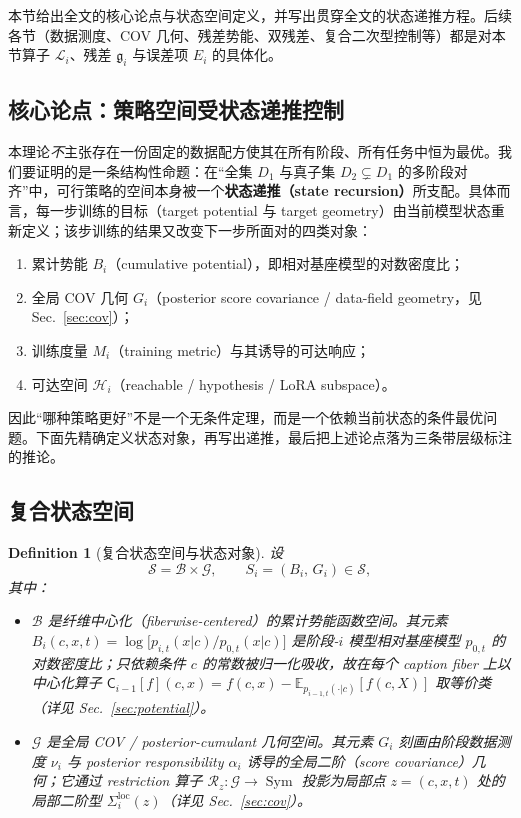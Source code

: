 \documentclass[11pt,a4paper]{article}
\newtheorem{definition}[theorem]{Definition}
\newcommand{\E}{\mathbb{E}}
\newcommand{\cH}{\mathcal{H}}   %
\newcommand{\cL}{\mathcal{L}}   %
\newcommand{\cS}{\mathcal{S}}   %
\newcommand{\cG}{\mathcal{G}}   %
\newcommand{\cB}{\mathcal{B}}   %
\newcommand{\Rstr}{\mathcal{R}}     %
\newcommand{\Center}{\mathsf{C}}    %
\newcommand{\gres}{\bm{\mathfrak{g}}} %
\newcommand{\Sym}{\operatorname{Sym}}
\begin{document}
本节给出全文的核心论点与状态空间定义，并写出贯穿全文的状态递推方程。后续各节（数据测度、COV 几何、残差势能、双残差、复合二次型控制等）都是对本节算子 $\cL_i$、残差 $\gres_i$ 与误差项 $E_i$ 的具体化。

\subsection{核心论点：策略空间受状态递推控制}

本理论\emph{不}主张存在一份固定的数据配方使其在所有阶段、所有任务中恒为最优。我们要证明的是一条结构性命题：在“全集 $D_1$ 与真子集 $D_2\subsetneq D_1$ 的多阶段对齐”中，可行策略的空间本身被一个\textbf{状态递推（state recursion）}所支配。具体而言，每一步训练的目标（target potential 与 target geometry）由当前模型状态重新定义；该步训练的结果又改变下一步所面对的四类对象：

\begin{enumerate}[label=(\roman*)]
  \item 累计势能 $B_i$（cumulative potential），即相对基座模型的对数密度比；
  \item 全局 COV 几何 $G_i$（posterior score covariance / data-field geometry，见 Sec.~\ref{sec:cov}）；
  \item 训练度量 $M_i$（training metric）与其诱导的可达响应；
  \item 可达空间 $\cH_i$（reachable / hypothesis / LoRA subspace）。
\end{enumerate}

因此“哪种策略更好”不是一个无条件定理，而是一个依赖当前状态的条件最优问题。下面先精确定义状态对象，再写出递推，最后把上述论点落为三条带层级标注的推论。

\subsection{复合状态空间}

\begin{definition}[复合状态空间与状态对象]\label{def:s1:state-space}
设
\begin{equation}\label{eq:s1:state-space}
  \cS=\cB\times\cG,\qquad S_i=(B_i,\,G_i)\in\cS,
\end{equation}
其中：
\begin{itemize}
  \item $\cB$ 是\emph{纤维中心化}（fiberwise-centered）的累计势能函数空间。其元素
  $B_i(c,x,t)=\log\!\bigl[p_{i,t}(x|c)/p_{0,t}(x|c)\bigr]$ 是阶段-$i$ 模型相对基座模型 $p_{0,t}$ 的对数密度比；只依赖条件 $c$ 的常数被归一化吸收，故在每个 caption fiber 上以中心化算子
  $\Center_{i-1}[f](c,x)=f(c,x)-\E_{p_{i-1,t}(\cdot|c)}[f(c,X)]$ 取等价类（详见 Sec.~\ref{sec:potential}）。
  \item $\cG$ 是\emph{全局} COV / posterior-cumulant 几何空间。其元素 $G_i$ 刻画由阶段数据测度 $\nu_i$ 与 posterior responsibility $\alpha_i$ 诱导的全局二阶（score covariance）几何；它通过 restriction 算子 $\Rstr_z:\cG\to\Sym$ 投影为局部点 $z=(c,x,t)$ 处的局部二阶型 $\Sigma_i^{\mathrm{loc}}(z)$（详见 Sec.~\ref{sec:cov}）。
\end{itemize}
\end{definition}
\end{document}
